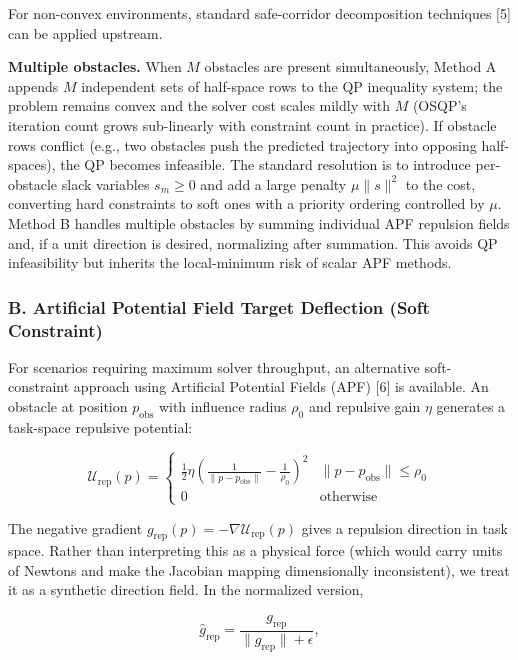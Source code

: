 For non-convex environments, standard safe-corridor decomposition
techniques {[}5{]} can be applied upstream.

\textbf{Multiple obstacles.} When \(M\) obstacles are present
simultaneously, Method A appends \(M\) independent sets of half-space
rows to the QP inequality system; the problem remains convex and the
solver cost scales mildly with \(M\) (OSQP's iteration count grows
sub-linearly with constraint count in practice). If obstacle rows
conflict (e.g., two obstacles push the predicted trajectory into
opposing half-spaces), the QP becomes infeasible. The standard
resolution is to introduce per-obstacle slack variables \(s_m \geq 0\)
and add a large penalty \(\mu \|s\|^2\) to the cost, converting hard
constraints to soft ones with a priority ordering controlled by \(\mu\).
Method B handles multiple obstacles by summing individual APF repulsion
fields and, if a unit direction is desired, normalizing after summation.
This avoids QP infeasibility but inherits the local-minimum risk of
scalar APF methods.

\subsubsection{B. Artificial Potential Field Target Deflection (Soft
Constraint)}\label{b.-artificial-potential-field-target-deflection-soft-constraint}

For scenarios requiring maximum solver throughput, an alternative
soft-constraint approach using Artificial Potential Fields (APF) {[}6{]}
is available. An obstacle at position \(p_{\text{obs}}\) with influence
radius \(\rho_0\) and repulsive gain \(\eta\) generates a task-space
repulsive potential:

\[\mathcal{U}_{\text{rep}}(p) = \begin{cases} \frac{1}{2} \eta \left(\frac{1}{\|p - p_{\text{obs}}\|} - \frac{1}{\rho_0}\right)^2 & \|p - p_{\text{obs}}\| \leq \rho_0 \\ 0 & \text{otherwise} \end{cases}\]

The negative gradient
\(g_{\text{rep}}(p)=-\nabla \mathcal{U}_{\text{rep}}(p)\) gives a
repulsion direction in task space. Rather than interpreting this as a
physical force (which would carry units of Newtons and make the Jacobian
mapping dimensionally inconsistent), we treat it as a synthetic
direction field. In the normalized version,

\[\hat{g}_{\text{rep}}=\frac{g_{\text{rep}}}{\|g_{\text{rep}}\|+\epsilon},\]

